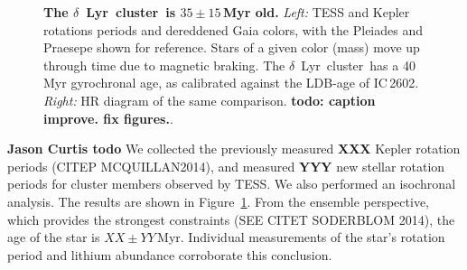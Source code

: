 \documentclass[12pt,modern,twocolumn,tighten]{aastex63}
\newcommand{\cn}{$\delta$~Lyr\ cluster} %
\begin{document}
\begin{figure}[t]
	\begin{center}
		\leavevmode
	\end{center}
	\vspace{-0.7cm}
	\caption{
    {\bf The \cn\ is $35\pm15$\,Myr old.} {\it Left:} TESS and Kepler
    rotations periods and dereddened Gaia colors, with the Pleiades
    \citep[125\,Myr;][]{rebull_rotation_2016a} and Praesepe
    \citep[650\,Myr;][]{douglas_poking_2017} shown for reference.
    Stars of a given color (mass) move up through time due to magnetic
    braking.  The \cn\ has a 40 Myr gyrochronal age, as calibrated
    against the LDB-age of IC\,2602.  {\it Right:} HR diagram of the
    same comparison. {\bf todo: caption improve. fix figures.}.
   \label{fig:age}
	}
\end{figure}

{\bf Jason Curtis todo}
We collected the previously measured
{\bf XXX} Kepler rotation periods (CITEP MCQUILLAN2014), and measured
{\bf YYY} new stellar rotation periods for cluster members observed by
TESS.  We also performed an isochronal analysis.  The results are
shown in Figure~\ref{fig:age}.  From the ensemble perspective, which
provides the strongest constraints (SEE CITET SODERBLOM 2014), the age
of the star is $XX \pm YY$\,Myr.  Individual measurements of the
star's rotation period and lithium abundance corroborate this
conclusion.
\end{document}

